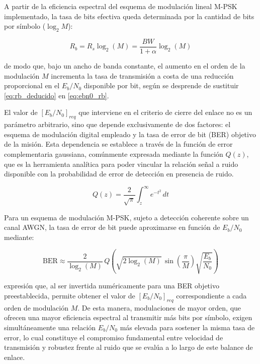 A partir de la eficiencia espectral del esquema de modulación lineal M-PSK implementado, la tasa de bits efectiva queda determinada por la cantidad de bits por símbolo ($\log_{2}M$):

\begin{equation}
    R_b = R_s \log_{2}(M) = \frac{BW}{1 + \alpha} \log_{2}(M)
    \label{eq:rb_deducido}
\end{equation}

de modo que, bajo un ancho de banda constante, el aumento en el orden de la modulación $M$ incrementa la tasa de transmisión a costa de una reducción proporcional en el $E_b/N_0$ disponible por bit, según se desprende de sustituir \eqref{eq:rb_deducido} en \eqref{eq:ebn0_rb}.

El valor de $[E_b/N_0]_{req}$ que interviene en el criterio de cierre del enlace no es un parámetro arbitrario, sino que depende exclusivamente de dos factores: el esquema de modulación digital empleado y la tasa de error de bit (BER) objetivo de la misión. Esta dependencia se establece a través de la función de error complementaria gaussiana, comúnmente expresada mediante la función $Q(z)$, que es la herramienta analítica para poder vincular la relación señal a ruido disponible con la probabilidad de error de detección en presencia de ruido.

\begin{equation}
    Q(z) = \frac{2}{\sqrt{\pi}} \int_{z}^{\infty} e^{-t^2}\, dt
    \label{eq:funcion_q}
\end{equation}

Para un esquema de modulación M-PSK, sujeto a detección coherente sobre un canal AWGN, la tasa de error de bit puede aproximarse en función de $E_b/N_0$ mediante:

\begin{equation}
    \text{BER} \approx \frac{2}{\log_{2}(M)}\, Q\!\left( \sqrt{2 \log_{2}(M)} \, \sin\!\left(\frac{\pi}{M}\right) \sqrt{\frac{E_b}{N_0}} \right)
    \label{eq:ber_mpsk}
\end{equation}

expresión que, al ser invertida numéricamente para una BER objetivo preestablecida, permite obtener el valor de $[E_b/N_0]_{req}$ correspondiente a cada orden de modulación $M$. De esta manera, modulaciones de mayor orden, que ofrecen una mayor eficiencia espectral al transmitir más bits por símbolo, exigen simultáneamente una relación $E_b/N_0$ más elevada para sostener la misma tasa de error, lo cual constituye el compromiso fundamental entre velocidad de transmisión y robustez frente al ruido que se evalúa a lo largo de este balance de enlace.

